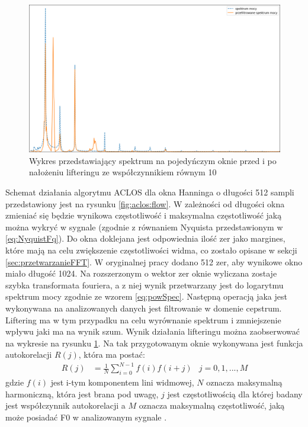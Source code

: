 \documentclass[12pt,a4paper,twoside]{mwart}
\begin{document}
\begin{figure}[H]
  \begin{center}
    \includegraphics[scale=0.49]{images/ACLOS/data_lifter_cropped.png}
    \caption{Wykres przedstawiający spektrum na pojedyńczym oknie przed i po nałożeniu lifteringu ze współczynnikiem równym 10}
    \label{fig:aclos:lifter}
  \end{center}
\end{figure}
Schemat działania algorytmu ACLOS dla okna Hanninga o długości 512 sampli przedstawiony jest na rysunku \ref{fig:aclos:flow}. W zależności od długości okna zmieniać się będzie wynikowa częstotliwość i maksymalna częstotliwość jaką można wykryć w sygnale (zgodnie z równaniem Nyquista przedstawionym w \ref{eq:NyquistFq}). Do okna doklejana jest odpowiednia ilość zer jako margines, które mają na celu zwiększenie częstotliwości widma, co zostało opisane w sekcji \ref{sec:przetwarzanieFFT}. W oryginalnej pracy dodano 512 zer, aby wynikowe okno miało długość 1024. Na rozszerzonym o wektor zer oknie wyliczana zostaje szybka transformata fouriera, a z niej wynik przetwarzany jest do logarytmu spektrum mocy zgodnie ze wzorem \ref{eq:powSpec}. Następną operacją jaka jest wykonywana na analizowanych danych jest filtrowanie w domenie cepstrum. Liftering ma w tym przypadku na celu wyrównanie spektrum i zmniejszenie wpływu jaki ma na wynik szum. Wynik działania lifteringu można zaobserwować na wykresie na rysunku \ref{fig:aclos:lifter}. Na tak przygotowanym oknie wykonywana jest funkcja autokorelacji $R(j)$, która ma postać:
\begin{align}\label{eq:Aclos:ACf}
  R(j)& = \frac{1}{N}\sum_{i=0}^{N-1}f(i)f(i + j)&
  j = 0, 1, ..., M
\end{align}
gdzie $f(i)$ jest i-tym komponentem lini widmowej, $N$ oznacza maksymalną harmoniczną, która jest brana pod uwagę, $j$ jest częstotliwością dla której badany jest współczynnik autokorelacji a $M$ oznacza maksymalną częstotliwość, jaką może posiadać F0 w analizowanym sygnale \cite[50-51]{Transcription:Quenneville:Thesis}.
\end{document}
